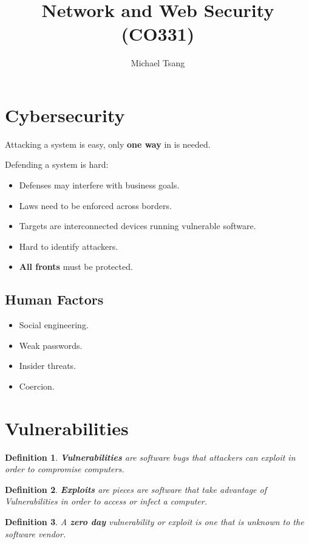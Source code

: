 \documentclass[11pt]{article}
\title{Network and Web Security (CO331)}
\author{Michael Tsang}
\newtheorem{defn}{Definition}
\begin{document}
\maketitle
\section{Cybersecurity}
Attacking a system is easy, only \textbf{one way} in is needed.

Defending a system is hard:
\begin{itemize}
  \item Defenses may interfere with business goals.
  \item Laws need to be enforced across borders.
  \item Targets are interconnected devices running vulnerable software.
  \item Hard to identify attackers.
  \item \textbf{All fronts} must be protected.
\end{itemize}

\subsection{Human Factors}
\begin{itemize}
  \item Social engineering.
  \item Weak passwords.
  \item Insider threats.
  \item Coercion.
\end{itemize}

\section{Vulnerabilities}
\begin{defn}
  \textbf{Vulnerabilities} are software bugs that attackers can exploit in order to compromise computers.
\end{defn}

\begin{defn}
  \textbf{Exploits} are pieces are software that take advantage of Vulnerabilities in order to access or infect a computer.
\end{defn}

\begin{defn}
  A \textbf{zero day} vulnerability or exploit is one that is unknown to the software vendor.
\end{defn}
\end{document}
